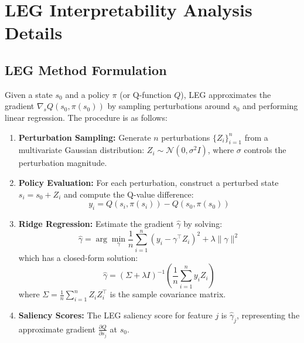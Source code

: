 
\appendix

\section{LEG Interpretability Analysis Details}\label{appendix:leg}

\subsection{LEG Method Formulation}

Given a state $s_0$ and a policy $\pi$ (or Q-function $Q$), LEG approximates the gradient $\nabla_s Q(s_0, \pi(s_0))$ by sampling perturbations around $s_0$ and performing linear regression. The procedure is as follows:

\begin{enumerate}
    \item \textbf{Perturbation Sampling:} Generate $n$ perturbations $\{Z_i\}_{i=1}^n$ from a multivariate Gaussian distribution: $Z_i \sim \mathcal{N}(0, \sigma^2 I)$, where $\sigma$ controls the perturbation magnitude.

    \item \textbf{Policy Evaluation:} For each perturbation, construct a perturbed state $s_i = s_0 + Z_i$ and compute the Q-value difference:
    \begin{equation}
    y_i = Q(s_i, \pi(s_i)) - Q(s_0, \pi(s_0))
    \end{equation}

    \item \textbf{Ridge Regression:} Estimate the gradient $\hat{\gamma}$ by solving:
    \begin{equation}
    \hat{\gamma} = \arg\min_{\gamma} \frac{1}{n} \sum_{i=1}^n \left( y_i - \gamma^\top Z_i \right)^2 + \lambda \|\gamma\|^2
    \end{equation}
    which has a closed-form solution:
    \begin{equation}
    \hat{\gamma} = \left( \Sigma + \lambda I \right)^{-1} \left( \frac{1}{n} \sum_{i=1}^n y_i Z_i \right)
    \end{equation}
    where $\Sigma = \frac{1}{n} \sum_{i=1}^n Z_i Z_i^\top$ is the sample covariance matrix.

    \item \textbf{Saliency Scores:} The LEG saliency score for feature $j$ is $\hat{\gamma}_j$, representing the approximate gradient $\frac{\partial Q}{\partial s_j}$ at $s_0$.
\end{enumerate}


